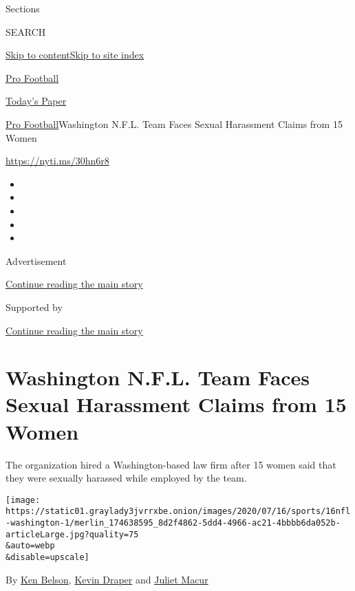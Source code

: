 Sections

SEARCH

\protect\hyperlink{site-content}{Skip to
content}\protect\hyperlink{site-index}{Skip to site index}

\href{https://www.nytimes3xbfgragh.onion/section/sports/football}{Pro
Football}

\href{https://myaccount.nytimes3xbfgragh.onion/auth/login?response_type=cookie\&client_id=vi}{}

\href{https://www.nytimes3xbfgragh.onion/section/todayspaper}{Today's
Paper}

\href{/section/sports/football}{Pro Football}\textbar{}Washington N.F.L.
Team Faces Sexual Harassment Claims from 15 Women

\url{https://nyti.ms/30hn6r8}

\begin{itemize}
\item
\item
\item
\item
\item
\end{itemize}

Advertisement

\protect\hyperlink{after-top}{Continue reading the main story}

Supported by

\protect\hyperlink{after-sponsor}{Continue reading the main story}

\hypertarget{washington-nfl-team-faces-sexual-harassment-claims-from-15-women}{%
\section{Washington N.F.L. Team Faces Sexual Harassment Claims from 15
Women}\label{washington-nfl-team-faces-sexual-harassment-claims-from-15-women}}

The organization hired a Washington-based law firm after 15 women said
that they were sexually harassed while employed by the team.

\texttt{[image: https://static01.graylady3jvrrxbe.onion/images/2020/07/16/sports/16nfl-washington-1/merlin\_174638595\_8d2f4862-5dd4-4966-ac21-4bbbb6da052b-articleLarge.jpg?quality=75\\\&auto=webp\\\&disable=upscale]}

By \href{https://www.nytimes3xbfgragh.onion/by/ken-belson}{Ken Belson},
\href{https://www.nytimes3xbfgragh.onion/by/kevin-draper}{Kevin Draper}
and \href{https://www.nytimes3xbfgragh.onion/by/juliet-macur}{Juliet
Macur}

